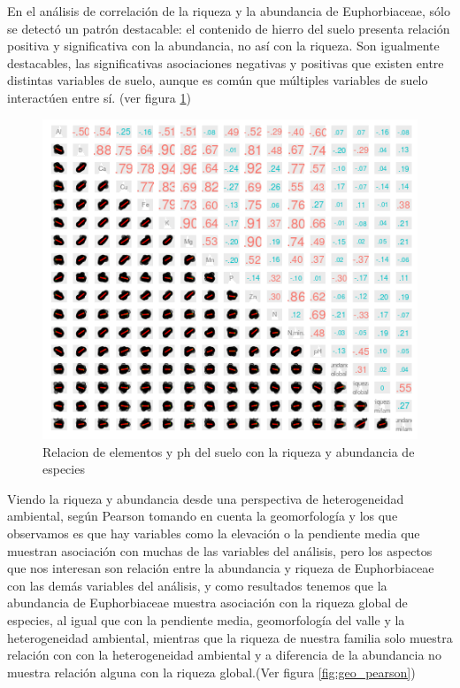 \documentclass[11pt,]{article}
\begin{document}
En el análisis de correlación de la riqueza y la abundancia de
Euphorbiaceae, sólo se detectó un patrón destacable: el contenido de
hierro del suelo presenta relación positiva y significativa con la
abundancia, no así con la riqueza. Son igualmente destacables, las
significativas asociaciones negativas y positivas que existen entre
distintas variables de suelo, aunque es común que múltiples variables de
suelo interactúen entre sí. (ver figura \ref{fig:suelo_ph_abun_riqu})

\begin{figure}
\centering
\includegraphics{suelo_ph_abun_riqu.png}
\caption{\label{fig:suelo_ph_abun_riqu}Relacion de elementos y ph del
suelo con la riqueza y abundancia de especies}
\end{figure}

Viendo la riqueza y abundancia desde una perspectiva de heterogeneidad
ambiental, según Pearson tomando en cuenta la geomorfología y los que
observamos es que hay variables como la elevación o la pendiente media
que muestran asociación con muchas de las variables del análisis, pero
los aspectos que nos interesan son relación entre la abundancia y
riqueza de Euphorbiaceae con las demás variables del análisis, y como
resultados tenemos que la abundancia de Euphorbiaceae muestra asociación
con la riqueza global de especies, al igual que con la pendiente media,
geomorfología del valle y la heterogeneidad ambiental, mientras que la
riqueza de nuestra familia solo muestra relación con con la
heterogeneidad ambiental y a diferencia de la abundancia no muestra
relación alguna con la riqueza global.(Ver figura \ref{fig:geo_pearson})
\end{document}
